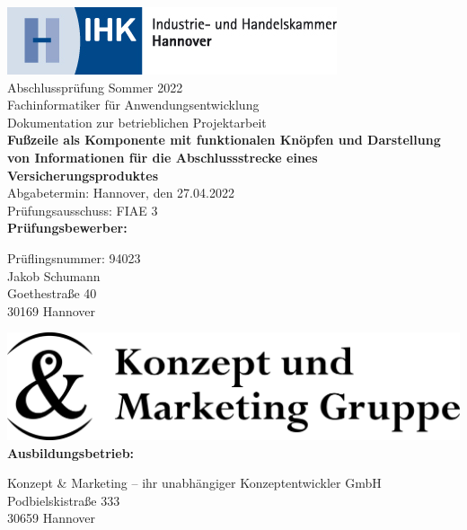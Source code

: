 \thispagestyle{empty}


\begin{center}
	\includegraphics[scale=0.9]{bilder/logo_ihkdata}\\[2ex]
	\Large{Abschlussprüfung Sommer 2022}\\[3ex]
	
	\Large{Fachinformatiker für Anwendungsentwicklung}\\
	\LARGE{Dokumentation zur betrieblichen Projektarbeit}\\[4ex]
	
	\huge{\textbf{Fußzeile als Komponente mit funktionalen Knöpfen und Darstellung von Informationen für die Abschlussstrecke eines Versicherungsproduktes}}\\[1ex]
	
	\normalsize
	Abgabetermin: Hannover, den 27.04.2022\\
	Prüfungsausschuss: FIAE 3\\[3em]
	
	\textbf{Prüfungsbewerber:}\\
	\begin{onehalfspace}
	Prüflingsnummer: 94023\\
	Jakob Schumann\\
	Goethestraße 40\\
	30169 Hannover\\[5ex]
	\end{onehalfspace}
	 
	\includegraphics[scale=0.3] {bilder/k&m.png}\\[1ex]

	\textbf{Ausbildungsbetrieb:}\\
	\begin{onehalfspace}
	Konzept \& Marketing – ihr unabhängiger Konzeptentwickler GmbH\\
	Podbielskistraße 333\\
	30659 Hannover\\[5em]
	\end{onehalfspace}
\end{center}
\newpage

